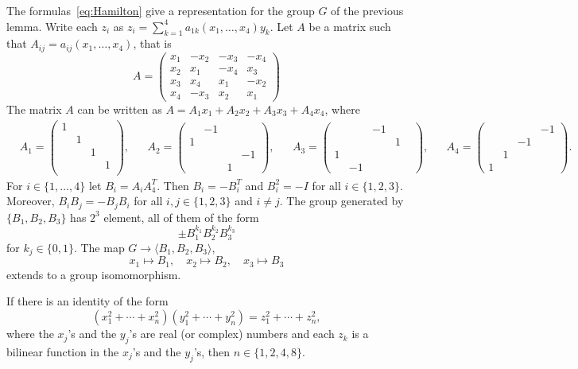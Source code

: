 \begin{example}
	The formulas~\eqref{eq:Hamilton} give a representation for the
	group $G$ of the previous lemma. Write each $z_i$ as 
	$z_i=\sum_{k=1}^4a_{1k}(x_1,\dots,x_4)y_k$. Let $A$ be a matrix
	such that 
	$A_{ij}=a_{ij}(x_1,\dots,x_4)$, that is 
	\[
		A=\begin{pmatrix}
			x_1 & -x_2 & -x_3 & -x_4\\
			x_2 & x_1 & -x_4 & x_3\\
			x_3 & x_4 & x_1 & -x_2\\
			x_4 & -x_3 & x_2 & x_1
		\end{pmatrix}
	\]
	The matrix $A$ can be written as $A=A_1x_1+A_2x_2+A_3x_3+A_4x_4$, where
	\begin{align*}
		&A_1=\begin{pmatrix}
		1\\
		&1\\
		&&1\\
		&&&1\\
		\end{pmatrix},
		&&
		A_2=\begin{pmatrix}
			& -1\\
			1 \\
			&&&-1\\
			&&1
		\end{pmatrix},
		&&
		A_3=\begin{pmatrix}
			&& -1 \\
			&&&1 & \\
			1\\
			&-1
		  \end{pmatrix},
		  &&
		  A_4=\begin{pmatrix}
			&&&-1\\
			&&-1\\
			&1\\
			1
		\end{pmatrix}.
	\end{align*}
	For $i\in\{1,\dots,4\}$ let $B_i=A_iA_4^T$. Then
	$B_i=-B_i^T$ and  $B_i^2=-I$ 
	for all $i\in\{1,2,3\}$. Moreover, $B_iB_j=-B_jB_i$ for all $i,j\in\{1,2,3\}$ and
	$i\ne j$.  
	The group generated by $\{B_1,B_2,B_3\}$ has $2^3$ element, all of them
	of the form
	\[
		\pm B_1^{k_1}B_2^{k_2}B_3^{k_3}
	\]
	for $k_j\in\{0,1\}$. 
    The map 
	$G\to\langle B_1,B_2,B_3\rangle$,
	\[
		x_1\mapsto B_1,\quad
		x_2\mapsto B_2,\quad
		x_3\mapsto B_3 
	\]
	extends to a group isomomorphism. 
\end{example}

\begin{theorem}[Hurwitz]
	If there is an identity of the form 
	\begin{equation}
		\label{eq:Hurwitz}
		(x_1^2+\cdots+x_n^2)(y_1^2+\cdots+y_n^2)=z_1^2+\cdots+z_n^2,
	\end{equation}
	where the $x_j$'s and the $y_j$'s are real (or complex) numbers and
	each $z_k$ is a bilinear function in the $x_j$'s and the $y_j$'s, then 
	$n\in\{1,2,4,8\}$.
\end{theorem}


